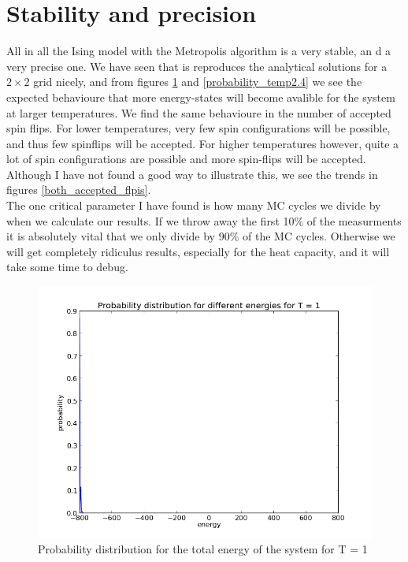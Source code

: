 \documentclass[a4paper,english, 10pt, twoside]{article}
\begin{document}
\section*{Stability and precision}
All in all the Ising model with the Metropolis algorithm is a very stable, an d a very precise one. We have seen that is reproduces 
the analytical solutions for a $2\times 2$ grid nicely, and from figures \ref{probability_temp1} and \ref{probability_temp2.4} we 
see the expected behavioure that more energy-states will become avalible for the system at larger temperatures. We find the same 
behavioure in the number of accepted spin flips. For lower temperatures, very few spin configurations will be possible, and thus 
few spinflips will be accepted. For higher temperatures however, quite a lot of spin configurations are possible and more spin-flips 
will be accepted. Although I have not found a good way to illustrate this, we see the trends in figures \ref{both_accepted_flpis}.\\
The one critical 
parameter I have found is how many MC cycles we divide by when we calculate our results. If we throw away the first 10\% of the 
measurments it is absolutely vital that we only divide by 90\% of the MC cycles. Otherwise we will get completely ridiculus 
results, especially for the heat capacity, and it will take some time to debug.
\begin{figure}[H]
 \centering
 \includegraphics[scale = 0.6]{probability_temp1.png}
 \caption{Probability distribution for the total energy of the system for T = 1}
 \label{probability_temp1}
\end{figure}
\end{document}

